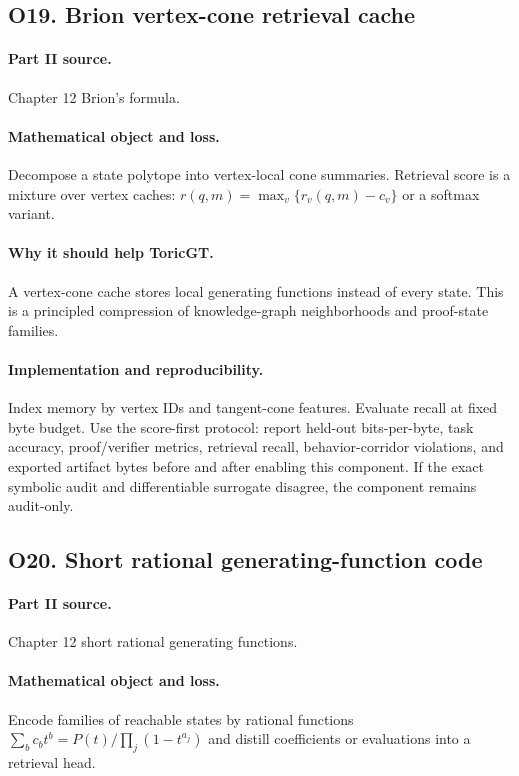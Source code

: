 \documentclass[11pt]{article}
\theoremstyle{definition}
\begin{document}
\subsection{O19. Brion vertex-cone retrieval cache}
\paragraph{Part II source.} Chapter 12 Brion's formula.
\paragraph{Mathematical object and loss.} Decompose a state polytope into vertex-local cone summaries.  Retrieval score is a mixture over vertex caches: $r(q,m)=\max_v \{r_v(q,m)-c_v\}$ or a softmax variant.
\paragraph{Why it should help ToricGT.} A vertex-cone cache stores local generating functions instead of every state.  This is a principled compression of knowledge-graph neighborhoods and proof-state families.
\paragraph{Implementation and reproducibility.} Index memory by vertex IDs and tangent-cone features.  Evaluate recall at fixed byte budget.  Use the score-first protocol: report held-out bits-per-byte, task accuracy, proof/verifier metrics, retrieval recall, behavior-corridor violations, and exported artifact bytes before and after enabling this component.  If the exact symbolic audit and differentiable surrogate disagree, the component remains audit-only.


\subsection{O20. Short rational generating-function code}
\paragraph{Part II source.} Chapter 12 short rational generating functions.
\paragraph{Mathematical object and loss.} Encode families of reachable states by rational functions $\sum_b c_b t^b=P(t)/\prod_j(1-t^{a_j})$ and distill coefficients or evaluations into a retrieval head.
\end{document}
